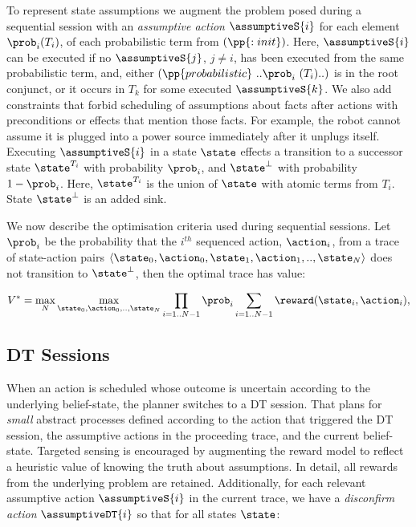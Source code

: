 To represent state assumptions we augment the problem posed during
a sequential session with an \emph{assumptive action} $\assumptiveS{i}$ for
each element $\prob_i (T_i)$, of each probabilistic term from
$(\pp{:init})$. Here, $\assumptiveS{i}$ can be executed if no
$\assumptiveS{j}$, $j \neq i$, has been executed from the same
probabilistic term, and, either
$(\pp{probabilistic}~..\prob_i~(T_i)..)$ is in the root conjunct, or
it occurs in $T_k$ for some executed $\assumptiveS{k}$.
We also add constraints that forbid scheduling of
assumptions about facts after actions with preconditions or effects
that mention those facts. For example, the robot cannot assume it is
plugged into a power source immediately after it unplugs itself.
Executing $\assumptiveS{i}$ in a state $\state$ effects a transition
to a successor state $\state^{T_i}$ with probability $\prob_i$, and
$\state^\bot$ with probability $1 - \prob_i$. Here, $\state^{T_i}$ is
the union of $\state$ with atomic terms from $T_i$. State
$\state^\bot$ is an added sink.


We now describe the optimisation criteria used during sequential
sessions. Let $\prob_i$ be the probability that the $i^{th}$ sequenced
action, $\action_i$, from a trace of state-action pairs
$\langle \state_0, \action_0,\state_1, \action_1,.., \state_N \rangle$
does not transition to $\state^\bot$, then the optimal
trace has value:

\small
\[
V^* = \max_N \max_{\state_0, \action_0,.., \state_N} \prod_{i=1..N-1} \prob_i \sum_{i=1..N-1}
\reward(\state_i, \action_i),
\]
\normalsize

\subsection{DT Sessions}

When an action is scheduled whose outcome is uncertain according to
the underlying belief-state, the planner switches to a DT
session. That plans for {\em small} abstract processes defined
according to the action that triggered the DT session, the assumptive
actions in the proceeding trace, and the current
belief-state. Targeted sensing is encouraged by augmenting the reward
model to reflect a heuristic value of knowing the truth about
assumptions. In detail, all rewards from the underlying problem are
retained. Additionally, for each relevant assumptive action
$\assumptiveS{i}$ in the current trace, we have a {\em disconfirm
action} $\assumptiveDT{i}$ so that for all states $\state$:

